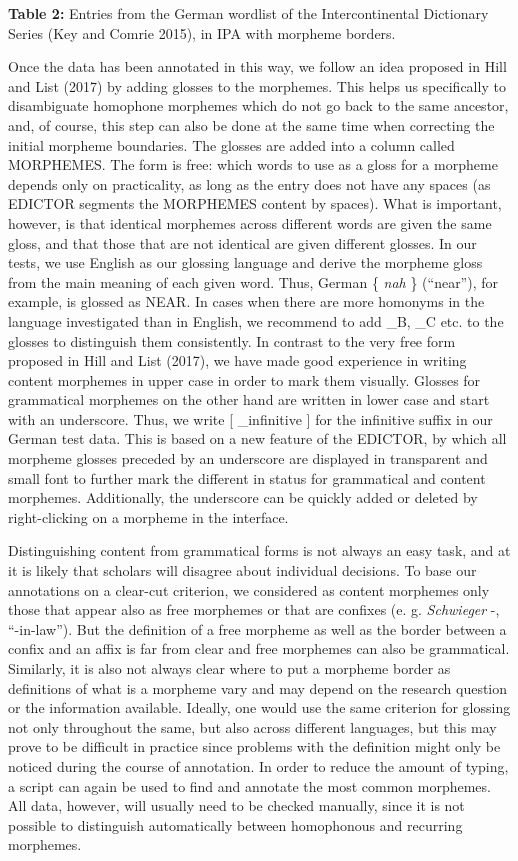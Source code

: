 \documentclass[
  english,
  a4paper,
  oneside,tablecaptionabove
]{scrbook}
\begin{document}
\textbf{Table 2:} Entries from the German wordlist of the
Intercontinental Dictionary Series (Key and Comrie 2015), in IPA with
morpheme borders.

Once the data has been annotated in this way, we follow an idea proposed
in Hill and List (2017) by adding glosses to the morphemes. This helps
us specifically to disambiguate homophone morphemes which do not go back
to the same ancestor, and, of course, this step can also be done at the
same time when correcting the initial morpheme boundaries. The glosses
are added into a column called MORPHEMES. The form is free: which words
to use as a gloss for a morpheme depends only on practicality, as long
as the entry does not have any spaces (as EDICTOR segments the MORPHEMES
content by spaces). What is important, however, is that identical
morphemes across different words are given the same gloss, and that
those that are not identical are given different glosses. In our tests,
we use English as our glossing language and derive the morpheme gloss
from the main meaning of each given word. Thus, German \{ \emph{nah} \}
(\enquote{near}), for example, is glossed as NEAR. In cases when there
are more homonyms in the language investigated than in English, we
recommend to add \_B, \_C etc. to the glosses to distinguish them
consistently. In contrast to the very free form proposed in Hill and
List (2017), we have made good experience in writing content morphemes
in upper case in order to mark them visually. Glosses for grammatical
morphemes on the other hand are written in lower case and start with an
underscore. Thus, we write {[} \_infinitive {]} for the infinitive
suffix in our German test data. This is based on a new feature of the
EDICTOR, by which all morpheme glosses preceded by an underscore are
displayed in transparent and small font to further mark the different in
status for grammatical and content morphemes. Additionally, the
underscore can be quickly added or deleted by right-clicking on a
morpheme in the interface.

Distinguishing content from grammatical forms is not always an easy
task, and at it is likely that scholars will disagree about individual
decisions. To base our annotations on a clear-cut criterion, we
considered as content morphemes only those that appear also as free
morphemes or that are confixes (e. g. \emph{Schwieger} -,
\enquote{-in-law}). But the definition of a free morpheme as well as the
border between a confix and an affix is far from clear and free
morphemes can also be grammatical. Similarly, it is also not always
clear where to put a morpheme border as definitions of what is a
morpheme vary and may depend on the research question or the information
available. Ideally, one would use the same criterion for glossing not
only throughout the same, but also across different languages, but this
may prove to be difficult in practice since problems with the definition
might only be noticed during the course of annotation. In order to
reduce the amount of typing, a script can again be used to find and
annotate the most common morphemes. All data, however, will usually need
to be checked manually, since it is not possible to distinguish
automatically between homophonous and recurring morphemes.
\end{document}
